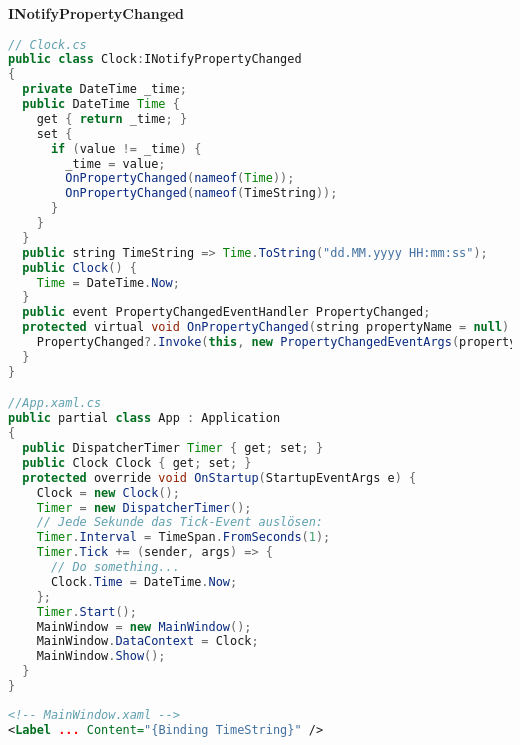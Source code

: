 \textbf{INotifyPropertyChanged}
\begin{lstlisting}[language=java]
// Clock.cs
public class Clock:INotifyPropertyChanged
{
  private DateTime _time;
  public DateTime Time {
    get { return _time; }
    set {
      if (value != _time) {
        _time = value;
        OnPropertyChanged(nameof(Time));
        OnPropertyChanged(nameof(TimeString));
      } 
    }
  }
  public string TimeString => Time.ToString("dd.MM.yyyy HH:mm:ss");
  public Clock() {
    Time = DateTime.Now;
  }
  public event PropertyChangedEventHandler PropertyChanged;
  protected virtual void OnPropertyChanged(string propertyName = null) {
    PropertyChanged?.Invoke(this, new PropertyChangedEventArgs(propertyName));
  }
}

//App.xaml.cs
public partial class App : Application
{
  public DispatcherTimer Timer { get; set; }
  public Clock Clock { get; set; }
  protected override void OnStartup(StartupEventArgs e) {
    Clock = new Clock();
    Timer = new DispatcherTimer();
    // Jede Sekunde das Tick-Event auslösen:
    Timer.Interval = TimeSpan.FromSeconds(1);
    Timer.Tick += (sender, args) => {
      // Do something...
      Clock.Time = DateTime.Now;
    };
    Timer.Start();
    MainWindow = new MainWindow();
    MainWindow.DataContext = Clock;
    MainWindow.Show();
  }
}
\end{lstlisting}

\begin{lstlisting}[language=xml]
<!-- MainWindow.xaml -->
<Label ... Content="{Binding TimeString}" />
\end{lstlisting}